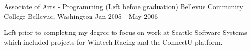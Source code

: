 

\begin{cventries}

  \cventry
      {Associate of Arts - Programming (Left before graduation)} %
      {Bellevue Community College} %
      {Bellevue, Washington} %
      {Jan 2005 - May 2006} %
      {
        \begin{cvitems} %
        \item {Left prior to completing my degree to focus on work at Seattle Software Systems which included projects for Wintech Racing and the ConnectU platform.}
        \end{cvitems}
      }

      \end{cventries}
